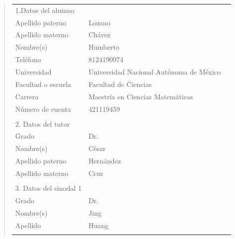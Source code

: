 {\small
\begin{quote}
\begin{tabular}{lll}
1.Datos del alumno          & {}                                            \\
Apellido paterno            & Lozano                                        \\
Apellido materno            & Ch\'avez                                      \\
Nombre(s)                   & Humberto                                      \\
Tel\'efono                  & 8124190974                                    \\
Universidad                 & Universidad Nacional Aut\'onoma de M\'exico   \\
Facultad o escuela          & Facultad de Ciencias                          \\
Carrera                     & Maestr\'ia en Ciencias Matem\'aticas          \\
N\'umero de cuenta          & 421119459                                     \\
{}                          & {}                                            \\
2. Datos del tutor          & {}                                            \\
Grado                       & Dr.                                           \\
Nombre(s)                   & C\'esar                                       \\
Apellido paterno            & Hern\'andez                                   \\
Apellido materno            & Cruz                                          \\
{}                          & {}                                            \\
3. Datos del sinodal 1      & {}                                            \\
Grado                       & Dr.                                           \\
Nombre(s)                   & Jing                                          \\
Apellido                    & Huang                                         \\
{}                          & {}                                            \\

\end{tabular}
\end{quote}}
